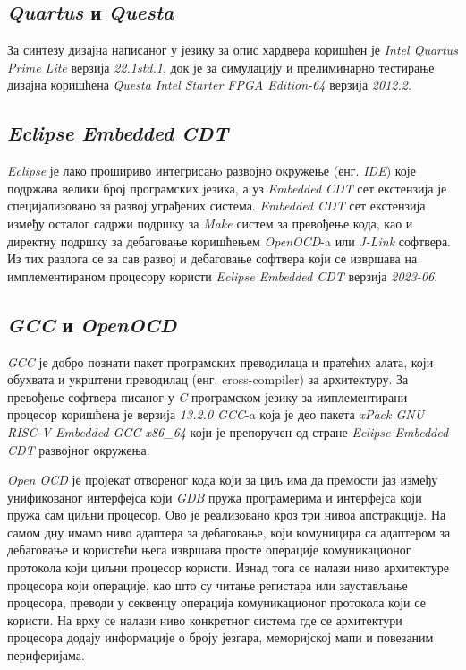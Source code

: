 \subsection{\textit{Quartus} и \textit{Questa}}

За синтезу дизајна написаног у језику за опис хардвера коришћен је \textit{Intel Quartus Prime Lite} \cite{quartus_man} верзија \textit{22.1std.1}, док је за симулацију и прелиминарно тестирање дизајна коришћена \textit{Questa Intel Starter FPGA Edition-64} \cite{questa_man} верзија \textit{2012.2}.


\subsection{\textit{Eclipse Embedded CDT}}

\textit{Eclipse} је лако прошириво интегрисанo развојно окружење (енг. \textit{\acrfull{IDE}}) које подржава велики број програмских језика, а уз \textit{Embedded \acrfull{CDT}} \cite{embcdt} сет екстензија је специјализовано за развој уграђених система. \textit{Embedded \acrshort{CDT}} сет екстензија између осталог садржи подршку за \textit{Make} систем за превођење кода, као и директну подршку за дебаговање коришћењем \textit{OpenOCD}-a или \textit{J-Link} софтвера.
Из тих разлога се за сав развој и дебаговање софтвера који се извршава на имплементираном процесору користи \textit{Eclipse Embedded CDT} верзија \textit{2023-06}.

\subsection{\textit{GCC} и \textit{OpenOCD}}

\textit{\acrfull{GCC}} \cite{gcc} је добро познати пакет програмских преводилаца и пратећих алата, који обухвата и укрштени преводилац (енг. cross-compiler) за  архитектуру.
За превођење софтвера писаног у \textit{C} програмском језику за имплементирани процесор коришћена је верзија \textit{13.2.0 \acrshort{GCC}}-a која је део пакета \textit{xPack GNU RISC-V Embedded GCC x86\_64} који је препоручен од стране \textit{Eclipse Embedded CDT} развојног окружења.

\textit{Open \acrfull{OCD}} \cite{openocd} је пројекат отвореног кода који за циљ има да премости јаз између унификованог интерфејса који \textit{\acrfull{GDB}} пружа програмерима и интерфејса који пружа сам циљни процесор.
Ово је реализовано кроз три нивоа апстракције. На самом дну имамо ниво адаптера за дебаговање, који комуницира са адаптером за дебаговање и користећи њега извршава просте операције комуникационог протокола који циљни процесор користи. Изнад тога се налази ниво архитектуре процесора који операције, као што су читање регистара или заустављање процесора, преводи у секвенцу операција комуникационог протокола који се користи. На врху се налази ниво конкретног система где се архитектури процесора додају информације о броју језгара, меморијској мапи и повезаним периферијама.

